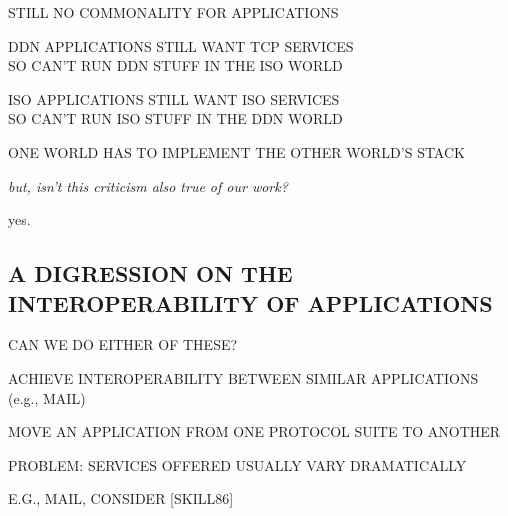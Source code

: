 \begin{bwslide}

\begin{nrtc}
\item	STILL NO COMMONALITY FOR APPLICATIONS
    \begin{nrtc}
    \item	DDN APPLICATIONS STILL WANT TCP SERVICES\\
		SO CAN'T RUN DDN STUFF IN THE ISO WORLD

    \item	ISO APPLICATIONS STILL WANT ISO SERVICES\\
		SO CAN'T RUN ISO STUFF IN THE DDN WORLD
    \end{nrtc}

\item	ONE WORLD HAS TO IMPLEMENT THE OTHER WORLD'S STACK
\end{nrtc}
\end{bwslide}


\begin{note}\em
but, isn't this criticism also true of our work?

yes.
\end{note}


\begin{bwslide}
\part	{A DIGRESSION ON THE INTEROPERABILITY OF APPLICATIONS}\bf

CAN WE DO EITHER OF THESE?
\begin{nrtc}
\item	ACHIEVE INTEROPERABILITY BETWEEN SIMILAR APPLICATIONS\\ (e.g., MAIL)

\item	MOVE AN APPLICATION FROM ONE PROTOCOL SUITE TO ANOTHER
\end{nrtc}
\end{bwslide}


\begin{bwslide}

\end{bwslide}


\begin{bwslide}

PROBLEM: SERVICES OFFERED USUALLY VARY DRAMATICALLY

\vspace{0.25in}
\vspace{0.25in}

E.G., MAIL, CONSIDER [SKILL86]
\end{bwslide}


